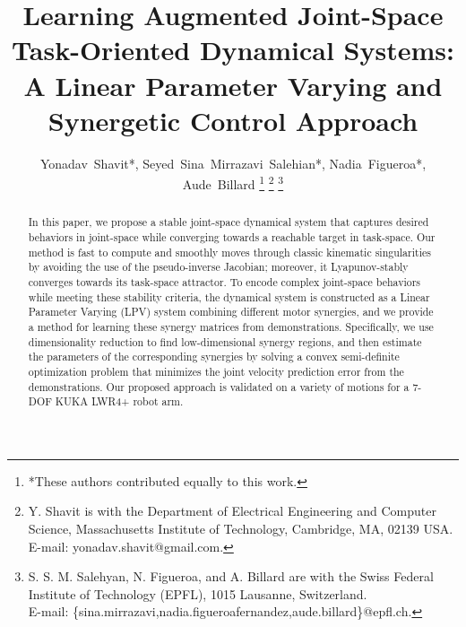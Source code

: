 \documentclass[letterpaper, 10 pt, conference,fleqn]{ieeeconf}
\begin{document}
%
\title{Learning Augmented Joint-Space Task-Oriented Dynamical Systems: \\ A
Linear Parameter Varying and Synergetic Control Approach}


%
%
\author{Yonadav~Shavit*,  Seyed~Sina~Mirrazavi~Salehian*, Nadia~Figueroa*, Aude~Billard
\thanks{*These authors contributed equally to this work.}
\thanks{Y. Shavit is with the Department
of Electrical Engineering and Computer Science, Massachusetts Institute of Technology, Cambridge,
MA, 02139 USA. E-mail: yonadav.shavit@gmail.com.}%
\thanks{S. S. M. Salehyan, N. Figueroa, and A. Billard are with the Swiss Federal Institute of Technology (EPFL), 1015 Lausanne, Switzerland. \\E-mail: \{sina.mirrazavi,nadia.figueroafernandez,aude.billard\}@epfl.ch.}
}%


\maketitle
\thispagestyle{empty}
\pagestyle{empty}



\begin{abstract}
In this paper, we propose a stable joint-space dynamical system that captures desired behaviors in joint-space while converging towards a reachable target in task-space. Our method is fast to compute and smoothly moves through classic kinematic singularities by avoiding the use of the pseudo-inverse Jacobian; moreover, it Lyapunov-stably converges towards its task-space attractor. To encode complex joint-space behaviors while meeting these stability criteria, the dynamical system is constructed as a Linear Parameter Varying (LPV) system combining different motor synergies, and we provide a method for learning these synergy matrices from demonstrations. Specifically, we use dimensionality reduction to find low-dimensional synergy regions, and then estimate the parameters of the corresponding synergies by solving a convex semi-definite optimization problem that minimizes the joint velocity prediction error from the demonstrations. Our proposed approach is validated on a variety of motions for a 7-DOF KUKA LWR4+ robot arm.\end{abstract}
\end{document}
